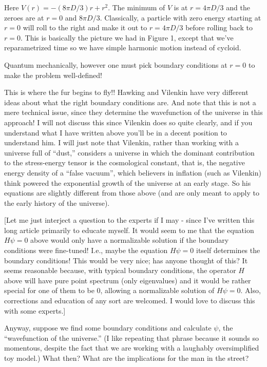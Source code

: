 \documentclass{article}
\begin{document}
Here \(V(r) = - (8\pi D/3)r + r^2\). The minimum of \(V\) is at
\(r = 4 \pi D/3\) and the zeroes are at \(r = 0\) and \(8 \pi D/3\).
Classically, a particle with zero energy starting at \(r = 0\) will roll
to the right and make it out to \(r = 4\pi D/3\) before rolling back to
\(r = 0\). This is basically the picture we had in Figure 1, except that
we've reparametrized time so we have simple harmonic motion instead of
cycloid.

Quantum mechanically, however one must pick boundary conditions at
\(r = 0\) to make the problem well-defined!

This is where the fur begins to fly!! Hawking and Vilenkin have very
different ideas about what the right boundary conditions are. And note
that this is not a mere technical issue, since they determine the
wavefunction of the universe in this approach! I will not discuss this
since Vilenkin does so quite clearly, and if you understand what I have
written above you'll be in a decent position to understand him. I will
just note that Vilenkin, rather than working with a universe full of
``dust,'' considers a universe in which the dominant contribution to the
stress-energy tensor is the cosmological constant, that is, the negative
energy density of a ``false vacuum'', which believers in inflation (such
as Vilenkin) think powered the exponential growth of the universe at an
early stage. So his equations are slightly different from those above
(and are only meant to apply to the early history of the universe).

{[}Let me just interject a question to the experts if I may - since I've
written this long article primarily to educate myself. It would seem to
me that the equation \(H \psi = 0\) above would only have a normalizable
solution if the boundary conditions were fine-tuned! I.e., maybe the
equation \(H \psi = 0\) itself determines the boundary conditions! This
would be very nice; has anyone thought of this? It seems reasonable
because, with typical boundary conditions, the operator \(H\) above will
have pure point spectrum (only eigenvalues) and it would be rather
special for one of them to be \(0\), allowing a normalizable solution of
\(H \psi = 0\). Also, corrections and education of any sort are
welcomed. I would love to discuss this with some experts.{]}

Anyway, suppose we find some boundary conditions and calculate \(\psi\),
the ``wavefunction of the universe.'' (I like repeating that phrase
because it sounds so momentous, despite the fact that we are working
with a laughably oversimplified toy model.) What then? What are the
implications for the man in the street?
\end{document}
